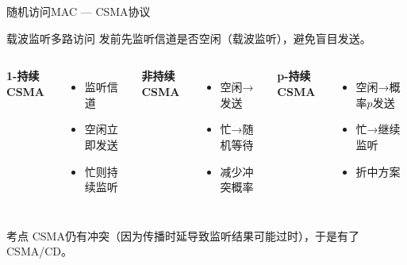 \documentclass[10pt, aspectratio=169]{beamer}
\begin{document}
\begin{frame}{随机访问MAC --- CSMA协议}
    \begin{block}{载波监听多路访问}
        发前先监听信道是否空闲（载波监听），避免盲目发送。
    \end{block}
    \vspace{0.3em}
    \begin{columns}[t]
        \textbf{1-持续CSMA}
        \begin{itemize}
            \item 监听信道
            \item 空闲立即发送
            \item 忙则持续监听
        \end{itemize}
        \textbf{非持续CSMA}
        \begin{itemize}
            \item 空闲→发送
            \item 忙→随机等待
            \item 减少冲突概率
        \end{itemize}
        \textbf{p-持续CSMA}
        \begin{itemize}
            \item 空闲→概率$p$发送
            \item 忙→继续监听
            \item 折中方案
        \end{itemize}
    \end{columns}
    \vspace{0.5em}
    \begin{exampleblock}{考点}
        CSMA仍有冲突（因为传播时延导致监听结果可能过时），于是有了CSMA/CD。
    \end{exampleblock}
\end{frame}
\end{document}
